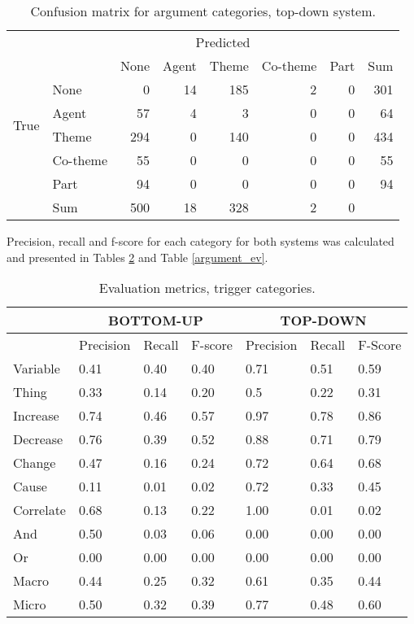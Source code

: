 \begin{table}
\begin{center}
\begin{tabular}{ | l | l | r | r | r | r | r | r | }
	\hline
	\multirow{8}{*}{True} & \multicolumn{7}{c|}{Predicted} \\ \cline{1-8}
	&\cellcolor{gray} & None & Agent & Theme & Co-theme & Part & Sum \\ \cline{2-8}
	&None & \cellcolor{g} 0 & 14 & 185 & 2 & 0 &  301 \\
	&Agent & 57 & \cellcolor{g} 4 & 3 & 0 & 0 & 64 \\
	&Theme & 294 & 0 & \cellcolor{g} 140 & 0 & 0 & 434 \\
	&Co-theme & 55 & 0 & 0 & \cellcolor{g} 0 & 0 & 55 \\
	&Part & 94 & 0 & 0 & 0 & \cellcolor{g} 0 & 94 \\ \hline	
	& Sum & 500 & 18 & 328 & 2 & 0 & \\ \hline
\end{tabular}
\end{center}
\caption{Confusion matrix for argument categories, top-down system.}
\label{pms_argument_conf}
\end{table}
\fi

Precision, recall and f-score for each category for both systems was calculated and presented in Tables \ref{trigger_ev} and Table \ref{argument_ev}. 

\begin{table}
\begin{center}
\begin{tabular}{ | l | l | l | l | l | l | l | }
	\hline
	\cellcolor{gray} & \multicolumn{3}{c}{BOTTOM-UP} & \multicolumn{3}{c|}{TOP-DOWN} \\ \hline
	\cellcolor{gray} & Precision & Recall & F-score & Precision & Recall & F-Score \\ \hline
	Variable & 0.41 & 0.40 & 0.40 & 0.71 & 0.51 & 0.59 \\
	Thing & 0.33 & 0.14 & 0.20 & 0.5 & 0.22 & 0.31 \\
	Increase & 0.74 & 0.46 & 0.57 & 0.97 & 0.78 & 0.86 \\
	Decrease & 0.76 & 0.39 & 0.52 & 0.88 & 0.71 & 0.79 \\ 
	Change & 0.47 & 0.16 & 0.24 & 0.72 & 0.64 & 0.68 \\ 
	Cause & 0.11 & 0.01 & 0.02 & 0.72 & 0.33 & 0.45 \\ 
	Correlate & 0.68 & 0.13 & 0.22 & 1.00 & 0.01 & 0.02 \\ 
	And & 0.50 & 0.03 & 0.06 & 0.00 & 0.00 & 0.00 \\
	Or & 0.00 & 0.00 & 0.00 & 0.00 & 0.00 & 0.00 \\ \hline
	Macro & 0.44 & 0.25 & 0.32 & 0.61 & 0.35 & 0.44 \\
	Micro & 0.50 & 0.32 & 0.39 & 0.77 & 0.48 & 0.60 \\ \hline
\end{tabular}
\end{center}
\caption{Evaluation metrics, trigger categories.}
\label{trigger_ev}
\end{table}

